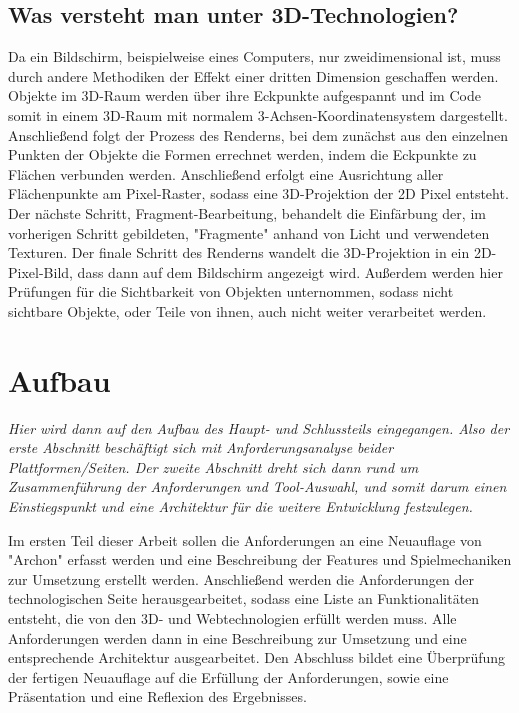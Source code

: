 \subsection{Was versteht man unter 3D-Technologien?}
Da ein Bildschirm, beispielweise eines Computers, nur zweidimensional ist, muss durch andere Methodiken der Effekt einer dritten Dimension geschaffen werden.\\Objekte im 3D-Raum werden über ihre Eckpunkte aufgespannt und im Code somit in einem 3D-Raum mit normalem 3-Achsen-Koordinatensystem dargestellt. Anschließend folgt der Prozess des Renderns, bei dem zunächst aus den einzelnen Punkten der Objekte die Formen errechnet werden, indem die Eckpunkte zu Flächen verbunden werden. Anschließend erfolgt eine Ausrichtung aller Flächenpunkte am Pixel-Raster, sodass eine 3D-Projektion der 2D Pixel entsteht. Der nächste Schritt, Fragment-Bearbeitung, behandelt die Einfärbung der, im vorherigen Schritt gebildeten, "Fragmente" anhand von Licht und verwendeten Texturen. Der finale Schritt des Renderns wandelt die 3D-Projektion in ein 2D-Pixel-Bild, dass dann auf dem Bildschirm angezeigt wird. Außerdem werden hier Prüfungen für die Sichtbarkeit von Objekten unternommen, sodass nicht sichtbare Objekte, oder Teile von ihnen, auch nicht weiter verarbeitet werden.
\section{Aufbau}
\label{sec:aufbau}

\emph{Hier wird dann auf den Aufbau des Haupt- und Schlussteils eingegangen. Also der erste Abschnitt beschäftigt sich mit Anforderungsanalyse beider Plattformen/Seiten. Der zweite Abschnitt dreht sich dann rund um Zusammenführung der Anforderungen und Tool-Auswahl, und somit darum einen Einstiegspunkt und eine Architektur für die weitere Entwicklung festzulegen. }

Im ersten Teil dieser Arbeit sollen die Anforderungen an eine Neuauflage von "Archon" erfasst werden und eine Beschreibung der Features und Spielmechaniken zur Umsetzung erstellt werden.
Anschließend werden die Anforderungen der technologischen Seite herausgearbeitet, sodass eine Liste an Funktionalitäten entsteht, die von den 3D- und Webtechnologien erfüllt werden muss.
Alle Anforderungen werden dann in eine Beschreibung zur Umsetzung und eine entsprechende Architektur ausgearbeitet.
Den Abschluss bildet eine Überprüfung der fertigen Neuauflage auf die Erfüllung der Anforderungen, sowie eine Präsentation und eine Reflexion des Ergebnisses.